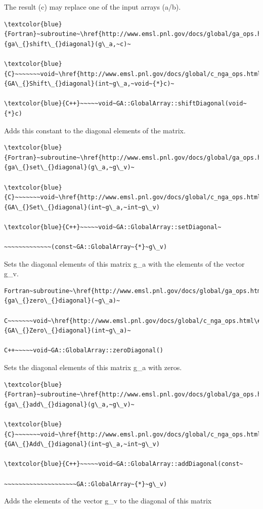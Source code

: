 The result (c) may replace one of the input arrays (a/b). 
\begin{verbatim}
\textcolor{blue}{Fortran}~subroutine~\href{http://www.emsl.pnl.gov/docs/global/ga_ops.html\#ga_shift_diagonal}{ga\_{}shift\_{}diagonal}(g\_a,~c)~

\textcolor{blue}{C}~~~~~~~void~\href{http://www.emsl.pnl.gov/docs/global/c_nga_ops.html\#ga_shift_diagonal}{GA\_{}Shift\_{}diagonal}(int~g\_a,~void~{*}c)~

\textcolor{blue}{C++}~~~~~void~GA::GlobalArray::shiftDiagonal(void~{*}c)
\end{verbatim}
Adds this constant to the diagonal elements of the matrix.
\begin{verbatim}
\textcolor{blue}{Fortran}~subroutine~\href{http://www.emsl.pnl.gov/docs/global/ga_ops.html\#ga_set_diagonal}{ga\_{}set\_{}diagonal}(g\_a,~g\_v)~

\textcolor{blue}{C}~~~~~~~void~\href{http://www.emsl.pnl.gov/docs/global/c_nga_ops.html\#ga_set_diagonal}{GA\_{}Set\_{}diagonal}(int~g\_a,~int~g\_v)

\textcolor{blue}{C++}~~~~~void~GA::GlobalArray::setDiagonal~

~~~~~~~~~~~~~(const~GA::GlobalArray~{*}~g\_v)
\end{verbatim}
Sets the diagonal elements of this matrix g\_a with the elements of
the vector g\_v.
\begin{verbatim}
Fortran~subroutine~\href{http://www.emsl.pnl.gov/docs/global/ga_ops.html\#ga_zero_diagonal}{ga\_{}zero\_{}diagonal}(~g\_a)~

C~~~~~~~void~\href{http://www.emsl.pnl.gov/docs/global/c_nga_ops.html\#ga_zero_diagonal}{GA\_{}Zero\_{}diagonal}(int~g\_a)~

C++~~~~~void~GA::GlobalArray::zeroDiagonal()
\end{verbatim}
Sets the diagonal elements of this matrix g\_a with zeros. 
\begin{verbatim}
\textcolor{blue}{Fortran}~subroutine~\href{http://www.emsl.pnl.gov/docs/global/ga_ops.html\#ga_add_diagonal}{ga\_{}add\_{}diagonal}(g\_a,~g\_v)~

\textcolor{blue}{C}~~~~~~~void~\href{http://www.emsl.pnl.gov/docs/global/c_nga_ops.html\#ga_add_diagonal}{GA\_{}Add\_{}diagonal}(int~g\_a,~int~g\_v)

\textcolor{blue}{C++}~~~~~void~GA::GlobalArray::addDiagonal(const~

~~~~~~~~~~~~~~~~~~~~GA::GlobalArray~{*}~g\_v)
\end{verbatim}
Adds the elements of the vector g\_v to the diagonal of this matrix
